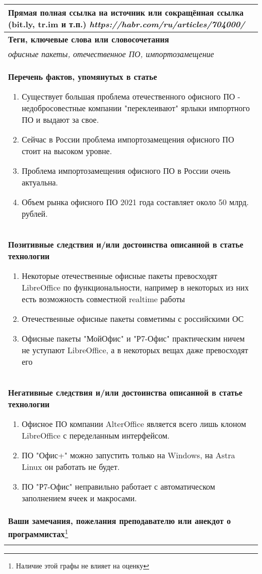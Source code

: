 \documentclass[12pt]{article}
\begin{document}
\begin{tabularx}{\textwidth} { 
  | >{\raggedright\arraybackslash}X|}
    \textbf{Прямая полная ссылка на источник или сокращённая ссылка (bit.ly, tr.im и т.п.)} 
    \textit{https://habr.com/ru/articles/704000/}
    \smallskip\\
    \hline
    \textbf{Теги, ключевые слова или словосочетания}\\
    \textit{офисные пакеты, отечественное ПО, импортозамещение}
    \smallskip\\
    \hline
    \textbf{Перечень фактов, упомянутых в статье}
    \begin{enumerate}
	\item Существует большая проблема отечественного офисного ПО - недобросовестные компании "переклеивают" ярлыки импортного ПО и выдают за свое.  
	\item Сейчас в России проблема импортозамещения офисного ПО стоит на высоком уровне.
	\item Проблема импортозамещения офисного ПО в России очень актуальна.
	\item Объем рынка офисного ПО 2021 года составляет около 50 млрд. рублей.
	\end{enumerate}
    \\ \hline
    \textbf{Позитивные следствия и/или достоинства описанной в статье технологии}
    \begin{enumerate}
    	\item Некоторые отечественные офисные пакеты превосходят LibreOffice по функциональности, например в некоторых из них есть возможность совместной realtime работы
	\item Отечественные офисные пакеты совметимы с российскими ОС 
	\item Офисные пакеты "МойОфис" и "Р7-Офис" практическим ничем не уступают LibreOffice, а в некоторых вещах даже превосходят его
    \end{enumerate}
    \\ \hline
    \textbf{Негативные следствия и/или достоинства описанной в статье технологии}
    \begin{enumerate}
	\item Офисное ПО компании AlterOffice является всего лишь клоном LibreOffice с переделанным интерфейсом.
    	\item ПО "Офис+" можно запустить только на Windows, на Astra Linux он работать не будет.
	\item ПО "Р7-Офис" неправильно работает с автоматическом заполнением ячеек и макросами.
    \end{enumerate}
    \\ \hline
    \textbf{Ваши замечания, пожелания преподавателю или анекдот о программистах}\footnote{Наличие этой графы не влияет на оценку}\\
\bigskip \\
\hline

\end{tabularx}
\end{document}

